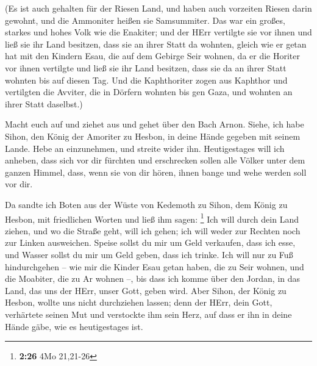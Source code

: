  (Es ist auch gehalten für der Riesen Land, und haben auch
vorzeiten Riesen darin gewohnt, und die Ammoniter heißen sie
Samsummiter.  Das war ein großes, starkes und hohes Volk
wie die Enakiter; und der HErr vertilgte sie vor ihnen und ließ sie ihr
Land besitzen, dass sie an ihrer Statt da wohnten,  gleich
wie er getan hat mit den Kindern Esau, die auf dem Gebirge Seir wohnen,
da er die Horiter vor ihnen vertilgte und ließ sie ihr Land besitzen,
dass sie da an ihrer Statt wohnten bis auf diesen Tag.  Und
die Kaphthoriter zogen aus Kaphthor und vertilgten die Avviter, die in
Dörfern wohnten bis gen Gaza, und wohnten an ihrer Statt daselbst.)

 Macht euch auf und ziehet aus und gehet über den Bach
Arnon. Siehe, ich habe Sihon, den König der Amoriter zu Hesbon, in deine
Hände gegeben mit seinem Lande. Hebe an einzunehmen, und streite wider
ihn.  Heutigestages will ich anheben, dass sich vor dir
fürchten und erschrecken sollen alle Völker unter dem ganzen Himmel,
dass, wenn sie von dir hören, ihnen bange und wehe werden soll vor dir.

 Da sandte ich Boten aus der Wüste von Kedemoth zu Sihon,
dem König zu Hesbon, mit friedlichen Worten und ließ ihm sagen:
\footnote{\textbf{2:26} 4Mo 21,21-26}  Ich will durch dein
Land ziehen, und wo die Straße geht, will ich gehen; ich will weder zur
Rechten noch zur Linken ausweichen.  Speise sollst du mir
um Geld verkaufen, dass ich esse, und Wasser sollst du mir um Geld
geben, dass ich trinke. Ich will nur zu Fuß hindurchgehen --
 wie mir die Kinder Esau getan haben, die zu Seir wohnen,
und die Moabiter, die zu Ar wohnen --, bis dass ich komme über den
Jordan, in das Land, das uns der HErr, unser Gott, geben wird.
 Aber Sihon, der König zu Hesbon, wollte uns nicht
durchziehen lassen; denn der HErr, dein Gott, verhärtete seinen Mut und
verstockte ihm sein Herz, auf dass er ihn in deine Hände gäbe, wie es
heutigestages ist.

